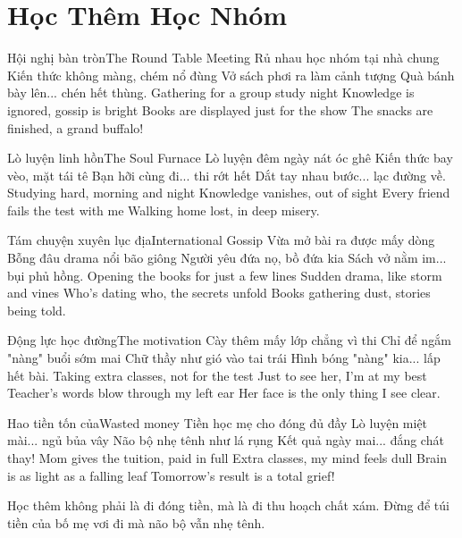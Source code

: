 \chapter{Học Thêm Học Nhóm}

\begin{tutuyetbox}{Hội nghị bàn tròn}{The Round Table Meeting}
Rủ nhau học nhóm tại nhà chung
Kiến thức không màng, chém nổ đùng
Vở sách phơi ra làm cảnh tượng
Quà bánh bày lên... chén hết thùng.
\tcblower
Gathering for a group study night 
Knowledge is ignored, gossip is bright 
Books are displayed just for the show 
The snacks are finished, a grand buffalo!
\end{tutuyetbox}

\begin{tutuyetbox}{Lò luyện linh hồn}{The Soul Furnace}
Lò luyện đêm ngày nát óc ghê
Kiến thức bay vèo, mặt tái tê
Bạn hỡi cùng đi... thi rớt hết
Dắt tay nhau bước... lạc đường về.
\tcblower
Studying hard, morning and night 
Knowledge vanishes, out of sight 
Every friend fails the test with me 
Walking home lost, in deep misery.
\end{tutuyetbox}

\begin{tutuyetbox}{Tám chuyện xuyên lục địa}{International Gossip}
Vừa mở bài ra được mấy dòng
Bỗng đâu drama nổi bão giông
Người yêu đứa nọ, bồ đứa kia
Sách vở nằm im... bụi phủ hồng.
\tcblower
Opening the books for just a few lines 
Sudden drama, like storm and vines 
Who's dating who, the secrets unfold 
Books gathering dust, stories being told.
\end{tutuyetbox}

\begin{tutuyetbox}{Động lực học đường}{The motivation}
Cày thêm mấy lớp chẳng vì thi
Chỉ để ngắm "nàng" buổi sớm mai
Chữ thầy như gió vào tai trái
Hình bóng "nàng" kia... lấp hết bài.
\tcblower
Taking extra classes, not for the test 
Just to see her, I'm at my best 
Teacher's words blow through my left ear 
Her face is the only thing I see clear.
\end{tutuyetbox}

\begin{tutuyetbox}{Hao tiền tốn của}{Wasted money}
Tiền học mẹ cho đóng đủ đầy
Lò luyện miệt mài... ngủ bủa vây
Não bộ nhẹ tênh như lá rụng
Kết quả ngày mai... đắng chát thay!
\tcblower
Mom gives the tuition, paid in full 
Extra classes, my mind feels dull 
Brain is as light as a falling leaf 
Tomorrow's result is a total grief!
\end{tutuyetbox}

\begin{ghichu}
Học thêm không phải là đi đóng tiền, mà là đi thu hoạch chất xám. Đừng để túi tiền của bố mẹ vơi đi mà não bộ vẫn nhẹ tênh.
\end{ghichu}
